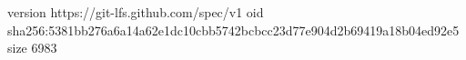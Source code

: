 version https://git-lfs.github.com/spec/v1
oid sha256:5381bb276a6a14a62e1dc10cbb5742bcbcc23d77e904d2b69419a18b04ed92e5
size 6983
